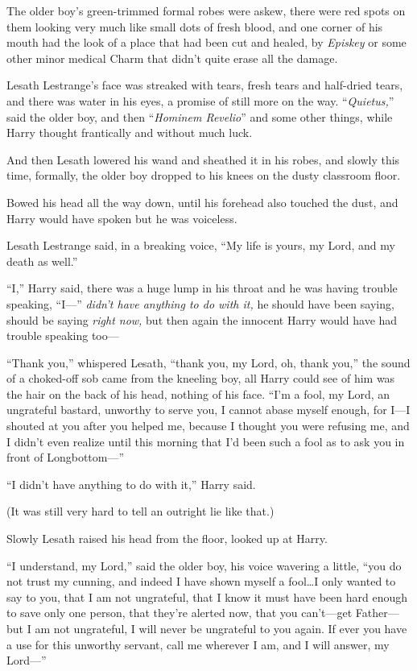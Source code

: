 The older boy’s green-trimmed formal robes were askew, there were red spots on them looking very much like small dots of fresh blood, and one corner of his mouth had the look of a place that had been cut and healed, by \emph{Episkey} or some other minor medical Charm that didn’t quite erase all the damage.

Lesath Lestrange’s face was streaked with tears, fresh tears and half-dried tears, and there was water in his eyes, a promise of still more on the way. “\emph{Quietus,}” said the older boy, and then “\emph{Hominem Revelio}” and some other things, while Harry thought frantically and without much luck.

And then Lesath lowered his wand and sheathed it in his robes, and slowly this time, formally, the older boy dropped to his knees on the dusty classroom floor.

Bowed his head all the way down, until his forehead also touched the dust, and Harry would have spoken but he was voiceless.

Lesath Lestrange said, in a breaking voice, “My life is yours, my Lord, and my death as well.”

“I,” Harry said, there was a huge lump in his throat and he was having trouble speaking, “I—” \emph{didn’t have anything to do with it,} he should have been saying, should be saying \emph{right now,} but then again the innocent Harry would have had trouble speaking too—

“Thank you,” whispered Lesath, “thank you, my Lord, oh, thank you,” the sound of a choked-off sob came from the kneeling boy, all Harry could see of him was the hair on the back of his head, nothing of his face. “I’m a fool, my Lord, an ungrateful bastard, unworthy to serve you, I cannot abase myself enough, for I—I shouted at you after you helped me, because I thought you were refusing me, and I didn’t even realize until this morning that I’d been such a fool as to ask you in front of Longbottom—”

“I didn’t have anything to do with it,” Harry said.

(It was still very hard to tell an outright lie like that.)

Slowly Lesath raised his head from the floor, looked up at Harry.

“I understand, my Lord,” said the older boy, his voice wavering a little, “you do not trust my cunning, and indeed I have shown myself a fool…I only wanted to say to you, that I am not ungrateful, that I know it must have been hard enough to save only one person, that they’re alerted now, that you can’t—get Father—but I am not ungrateful, I will never be ungrateful to you again. If ever you have a use for this unworthy servant, call me wherever I am, and I will answer, my Lord—”


